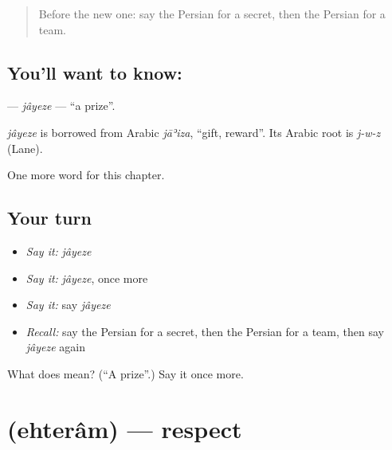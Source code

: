 \label{lesson:FA-C278-jayeze}



\begin{quote}
Before the new one: say the Persian for a secret, then the Persian for a team.
\end{quote}

\subsection*{You'll want to know: }
\textbf{} — \emph{jâyeze} — \textquotedblleft{}a prize\textquotedblright{}.

\begin{cousinweb}
\emph{jâyeze} is borrowed from Arabic \emph{jāʾiza}, \textquotedblleft{}gift, reward\textquotedblright{}. Its Arabic root is \emph{j-w-z} (Lane).
\end{cousinweb}

\begin{grammarlens}[title={What you've built}]
One more word for this chapter.
\end{grammarlens}

\subsection*{Your turn}
\begin{itemize}
\raggedright
  \item \emph{Say it:} \emph{jâyeze}
  \item \emph{Say it:} \emph{jâyeze}, once more
  \item \emph{Say it:} say \emph{jâyeze}
  \item \emph{Recall:} say the Persian for a secret, then the Persian for a team, then say \emph{jâyeze} again
\end{itemize}

\begin{tcolorbox}[breakable,colback=teal!4,colframe=teal!35!black,title={Before you move on}]
What does  mean? (\textquotedblleft{}A prize\textquotedblright{}.) Say it once more.
\end{tcolorbox}
\section[\texorpdfstring{\fa{احترام} (ehterâm)}{احترام (ehterâm)}]{ (ehterâm) — respect}

\label{lesson:FA-C278-ehteram}




